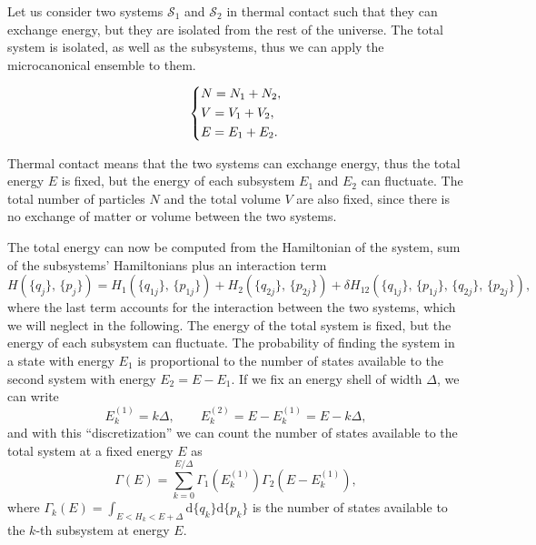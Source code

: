 Let us consider two systems \(\mathcal{S}_1\) and \(\mathcal{S}_2\) in thermal contact such that they can exchange energy, but they are isolated from the rest of the universe. The total system is isolated, as well as the subsystems, thus we can apply the microcanonical ensemble to them.
\begin{figure}[H]
    \begin{minipage}{0.5\textwidth}
        \centering
    \end{minipage}
    \hfill
    \begin{minipage}{0.45\textwidth}
        \[
            \begin{dcases}
                N = N_1 + N_2, \\
                V = V_1 + V_2, \\
                E = E_1 + E_2.
            \end{dcases}
        \]
    \end{minipage}
\end{figure}
Thermal contact means that the two systems can exchange energy, thus the total energy \(E\) is fixed, but the energy of each subsystem \(E_1\) and \(E_2\) can fluctuate. The total number of particles \(N\) and the total volume \(V\) are also fixed, since there is no exchange of matter or volume between the two systems.

The total energy can now be computed from the Hamiltonian of the system, sum of the subsystems' Hamiltonians plus an interaction term
\[
    H(\{q_j\},\,\{p_j\}) = H_1(\{q_{1j}\},\,\{p_{1j}\}) + H_2(\{q_{2j}\},\,\{p_{2j}\}) + \delta H_{12}(\{q_{1j}\},\,\{p_{1j}\},\,\{q_{2j}\},\,\{p_{2j}\}),
\]
where the last term accounts for the interaction between the two systems, which we will neglect in the following. The energy of the total system is fixed, but the energy of each subsystem can fluctuate. The probability of finding the system in a state with energy \(E_1\) is proportional to the number of states available to the second system with energy \(E_2 = E - E_1\). If we fix an energy shell of width \(\Delta\), we can write
\[
    E_k^{(1)} = k \Delta, \qquad E_k^{(2)} = E - E_k^{(1)} = E - k \Delta,
\]
and with this ``discretization'' we can count the number of states available to the total system at a fixed energy \(E\) as
\[
    \Gamma(E) = \sum_{k=0}^{E/\Delta} \Gamma_1(E_k^{(1)}) \Gamma_2(E-E_k^{(1)}),
\]
where \(\Gamma_k(E) = \int_{E < H_k < E + \Delta} \mathrm{d}\{q_{k}\} \mathrm{d}\{p_{k}\}\) is the number of states available to the \(k\)-th subsystem at energy \(E\).

